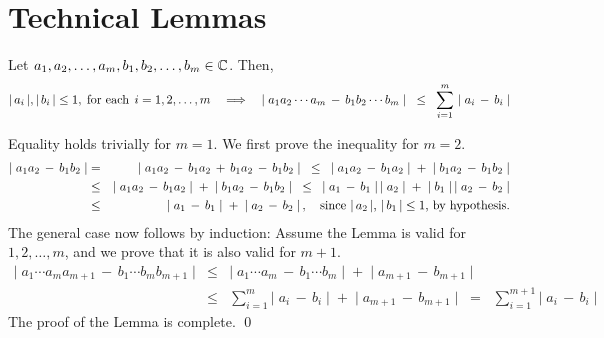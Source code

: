 

\section{Technical Lemmas}
\setcounter{theorem}{0}
\setcounter{equation}{0}

\renewcommand{\theenumi}{\alph{enumi}}
\renewcommand{\labelenumi}{\textnormal{(\theenumi)}$\;\;$}

\begin{lemma}
\label{BillingsleyThreeFiveEight}
Let $a_{1},a_{2},\ldots,a_{m},b_{1},b_{2},\ldots,b_{m}\in\mathbb{C}$.
Then,
\begin{equation*}
\vert\,a_{i}\,\vert, \vert\,b_{i}\,\vert \leq 1,
\;\textnormal{for each}\;\, i = 1, 2, \ldots, m
\quad\Longrightarrow\quad
\vert\;a_{1} a_{2} \cdots a_{m} \,-\, b_{1}b_{2}\cdots b_{m}\;\vert
\;\; \leq \;\;
\sum_{i=1}^{m}\,\left\vert\; a_{i} \, - \, b_{i} \;\right\vert
\end{equation*}
\end{lemma}
\proof
Equality holds trivially for $m = 1$. We first prove the inequality for $m = 2$.
\begin{eqnarray*}
\left\vert\; a_{1}a_{2} \,-\, b_{1}b_{2} \;\right\vert
&=& \left\vert\; a_{1}a_{2} \,-\, b_{1}a_{2} \,+\, b_{1}a_{2} \,-\, b_{1}b_{2} \;\right\vert
\;\;\leq\;\; \left\vert\; a_{1}a_{2} \,-\, b_{1}a_{2} \;\right\vert \;+\; \left\vert\; b_{1}a_{2} \,-\, b_{1}b_{2} \;\right\vert
\\
&\leq& \left\vert\; a_{1}a_{2} \,-\, b_{1}a_{2} \;\right\vert \;+\; \left\vert\; b_{1}a_{2} \,-\, b_{1}b_{2} \;\right\vert
\;\;\leq\;\; \left\vert\; a_{1} \,-\, b_{1} \;\right\vert \left\vert\;a_{2}\;\right\vert \;+\; \left\vert\;b_{1}\;\right\vert \left\vert\; a_{2} \,-\, b_{2} \;\right\vert
\\
&\leq& \left\vert\; a_{1} \,-\, b_{1} \;\right\vert \;+\; \left\vert\; a_{2} \,-\, b_{2} \;\right\vert,
\quad\textnormal{since $\vert\,a_{2}\,\vert$, $\vert\,b_{1}\,\vert \leq 1$, by hypothesis}.
\end{eqnarray*}
The general case now follows by induction: Assume the Lemma is valid for $1, 2, \ldots, m$,
and we prove that it is also valid for $m+1$.
\begin{eqnarray*}
\vert\;a_{1}\cdots a_{m}a_{m+1} \,-\, b_{1}\cdots b_{m}b_{m+1}\;\vert
&\leq& \vert\;a_{1}\cdots a_{m} \,-\, b_{1}\cdots b_{m}\;\vert \;+\; \vert\;a_{m+1} \,-\, b_{m+1}\;\vert
\\
&\leq& \sum_{i=1}^{m}\vert\;a_{i} \,-\, b_{i}\;\vert \;+\; \vert\;a_{m+1} \,-\, b_{m+1}\;\vert
\;\;=\;\; \sum_{i=1}^{m+1}\vert\;a_{i} \,-\, b_{i}\;\vert
\end{eqnarray*}
The proof of the Lemma is complete.
\qed

